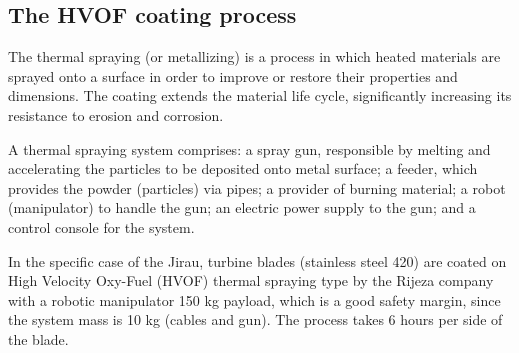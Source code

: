 \subsection{The HVOF coating process}\label{sec::desc_hvof}
The thermal spraying (or metallizing) is a process in which
heated materials are sprayed onto a surface in order to improve or
restore their properties and dimensions. The coating extends the material life
cycle, significantly increasing its resistance to erosion and corrosion. 


A thermal spraying system comprises: a spray gun, responsible
by melting and accelerating the particles to be deposited onto metal
surface; a feeder, which provides the powder (particles) via pipes;
a provider of burning material; a robot (manipulator) to handle the gun; an
electric power supply to the gun; and a control console for the system.

In the specific case of the Jirau, turbine blades (stainless steel 420)%
are coated on High Velocity Oxy-Fuel (HVOF) thermal spraying type by the
Rijeza company with a robotic manipulator 150 kg payload, which is a good
safety margin, since the system mass is 10 kg (cables and gun). The process
takes 6 hours per side of the blade.


